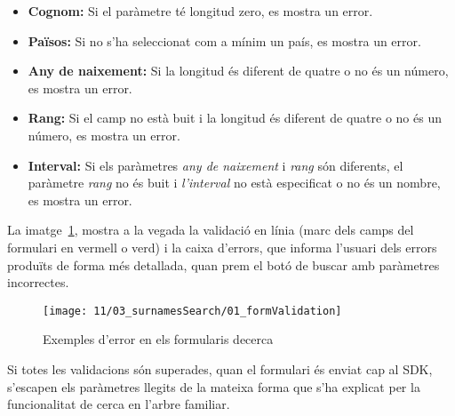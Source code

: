 \begin{itemize}
    \item \textbf{Cognom:} Si el paràmetre té longitud zero, es mostra un error.
    \item \textbf{Països:} Si no s'ha seleccionat com a mínim un país, es mostra un error.
    \item \textbf{Any de naixement:} Si la longitud és diferent de quatre o no és un número, es mostra un error.
    \item \textbf{Rang:} Si el camp no està buit i la longitud és diferent de quatre o no és un número, es mostra un error.
    \item \textbf{Interval:} Si els paràmetres \emph{any de naixement} i \emph{rang} són diferents, el paràmetre \emph{rang} no és buit i \emph{l’interval} no està especificat o no és un nombre, es mostra un error.
\end{itemize}

La imatge~\ref{fig:surnamesError}, mostra a la vegada la validació en línia (marc dels camps del formulari en vermell o verd) i la caixa d'errors, que informa l'usuari dels errors produïts de forma més detallada, quan prem el botó de buscar amb paràmetres incorrectes.

\begin{figure}[h]
    \texttt{[image: 11/03\_surnamesSearch/01\_formValidation]}
    \centering
    \caption{Exemples d'error en els formularis decerca}\label{fig:surnamesError}
\end{figure}

Si totes les validacions són superades, quan el formulari és enviat cap al SDK, s'escapen els paràmetres llegits de la mateixa forma que s'ha explicat per la funcionalitat de cerca en l’arbre familiar.
